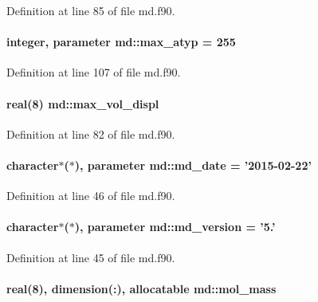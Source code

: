 Definition at line 85 of file md.\-f90.

\hypertarget{classmd_a7f8aa5c2e75f9e30fdbf640c8e8fcfa3}{
\paragraph[{max\-\_\-atyp}]{\setlength{\rightskip}{0pt plus 5cm}integer, parameter md\-::max\-\_\-atyp = 255}}\label{classmd_a7f8aa5c2e75f9e30fdbf640c8e8fcfa3}


Definition at line 107 of file md.\-f90.

\hypertarget{classmd_a3101b7169d48d4ae8728de15cc02674b}{
\paragraph[{max\-\_\-vol\-\_\-displ}]{\setlength{\rightskip}{0pt plus 5cm}real(8) md\-::max\-\_\-vol\-\_\-displ}}\label{classmd_a3101b7169d48d4ae8728de15cc02674b}


Definition at line 82 of file md.\-f90.

\hypertarget{classmd_a6c2c232df9edb1644753158383775aa5}{
\paragraph[{md\-\_\-date}]{\setlength{\rightskip}{0pt plus 5cm}character$\ast$($\ast$), parameter md\-::md\-\_\-date = '2015-\/02-\/22'}}\label{classmd_a6c2c232df9edb1644753158383775aa5}


Definition at line 46 of file md.\-f90.

\hypertarget{classmd_abb490d4badb544874ee4342f02ba7fa8}{
\paragraph[{md\-\_\-version}]{\setlength{\rightskip}{0pt plus 5cm}character$\ast$($\ast$), parameter md\-::md\-\_\-version = '5.'}}\label{classmd_abb490d4badb544874ee4342f02ba7fa8}


Definition at line 45 of file md.\-f90.

\hypertarget{classmd_a87331b9b984a7e0be2087e459611064c}{
\paragraph[{mol\-\_\-mass}]{\setlength{\rightskip}{0pt plus 5cm}real(8), dimension(\-:), allocatable md\-::mol\-\_\-mass}}\label{classmd_a87331b9b984a7e0be2087e459611064c}


